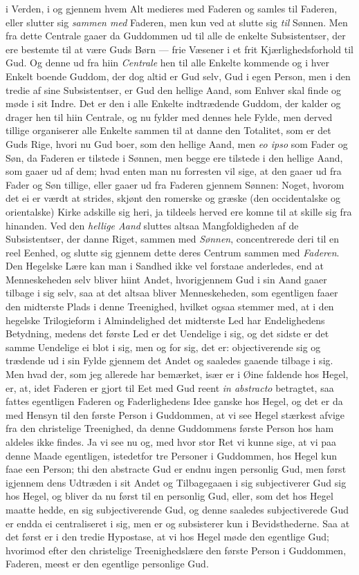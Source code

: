 \documentclass[12pt,a4paper]{book}
\newcommand{\apage}[1]{\marginnote{\footnotesize\textit{[#1]}}}
\begin{document}
i Verden, i og gjennem hvem Alt medieres med Faderen og samles til Faderen,
eller slutter sig \emph{sammen med} Faderen, men kun ved at slutte sig \emph{til}
Sønnen. Men fra dette Centrale gaaer da Guddommen ud til alle de enkelte
Subsistentser, der ere bestemte til at være Guds Børn --- frie Væsener i et frit
Kjærlighedsforhold til Gud. Og denne ud fra hiin \emph{Centrale} hen til alle Enkelte
kommende og i hver Enkelt boende Guddom, der dog altid er Gud selv, Gud i egen
Person, men i den tredie af sine Subsistentser, er Gud \apage{143} den hellige Aand, som
Enhver skal finde og møde i sit Indre. Det er den i alle Enkelte indtrædende
Guddom, der kalder og drager hen til hiin Centrale, og nu fylder med dennes hele
Fylde, men derved tillige organiserer alle Enkelte sammen til at danne den
Totalitet, som er det Guds Rige, hvori nu Gud boer, som den hellige Aand, men
\textit{eo ipso} som Fader og Søn, da Faderen er tilstede i Sønnen, men begge ere
tilstede i den hellige Aand, som gaaer ud af dem; hvad enten man nu forresten vil
sige, at den gaaer ud fra Fader og Søn tillige, eller gaaer ud fra Faderen
gjennem Sønnen: Noget, hvorom det ei er værdt at strides, skjønt den romerske og
græske (den occidentalske og orientalske) Kirke adskille sig heri, ja tildeels
herved ere komne til at skille sig fra hinanden. Ved den \emph{hellige Aand} sluttes
altsaa Mangfoldigheden af de Subsistentser, der danne Riget, sammen med \emph{Sønnen},
concentrerede deri til en reel Eenhed, og slutte sig gjennem dette deres Centrum
sammen med \emph{Faderen}. Den Hegelske Lære kan man i Sandhed ikke vel forstaae
anderledes, end at Menneskeheden selv bliver hiint Andet, hvorigjennem Gud i sin
Aand gaaer tilbage i sig selv, saa at det altsaa bliver Menneskeheden, som
egentligen faaer den midterste Plads i denne Treenighed, hvilket ogsaa stemmer
med, at i den hegelske Trilogieform i Almindelighed det midterste Led har
Endelighedens Betydning, medens det første Led er det Uendelige i sig, og det
sidste er det samme Uendelige ei blot i sig, men og for sig, det er:
objectiverende sig og trædende ud i sin Fylde gjennem det Andet og saaledes
gaaende tilbage i sig. Men hvad der, som jeg allerede har bemærket, især er i
Øine faldende hos Hegel, er, at, idet Faderen er gjort til Eet med Gud reent
\textit{in abstracto} betragtet, saa fattes egentligen Faderen og Faderlighedens
Idee ganske hos Hegel, og det er da med Hensyn til den første Person i Guddommen,
at vi see Hegel stærkest afvige fra den christelige Treenighed, da denne
Guddommens første Person hos \apage{144} ham aldeles ikke findes. Ja vi see nu og, med hvor
stor Ret vi kunne sige, at vi paa denne Maade egentligen, istedetfor tre Personer
i Guddommen, hos Hegel kun faae een Person; thi den abstracte Gud er endnu ingen
personlig Gud, men først igjennem dens Udtræden i sit Andet og Tilbagegaaen i sig
subjectiverer Gud sig hos Hegel, og bliver da nu først til en personlig Gud,
eller, som det hos Hegel maatte hedde, en sig subjectiverende Gud, og denne
saaledes subjectiverede Gud er endda ei centraliseret i sig, men er og subsisterer
kun i Bevidsthederne. Saa at det først er i den tredie Hypostase, at vi hos Hegel
møde den egentlige Gud; hvorimod efter den christelige Treenighedslære den første
Person i Guddommen, Faderen, meest er den egentlige personlige Gud.
\end{document}
